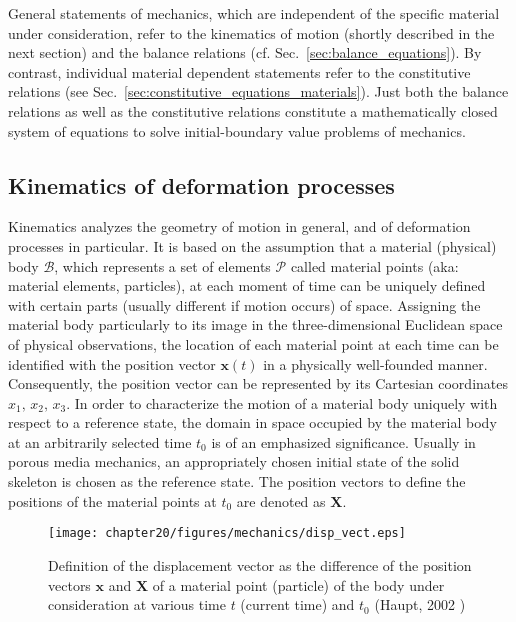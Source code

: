 General statements of mechanics, which are independent of the specific material under consideration, refer to the kinematics of motion (shortly described in the next section) and the balance relations (cf. Sec.~\ref{sec:balance_equations}). By contrast, individual material dependent statements refer to the constitutive relations (see Sec.~\ref{sec:constitutive_equations_materials}). Just both the balance relations as well as the constitutive relations constitute a mathematically closed system of equations to solve initial-boundary value problems of mechanics.

\subsection{Kinematics of deformation processes}
\label{sec:kinematics}

Kinematics analyzes the geometry of motion in general, and of deformation processes in particular. It is based on the assumption that a material (physical) body $\mathcal{B}$, which represents a set of elements $\mathcal{P}$ called material points (aka: material elements, particles), at each moment of time can be uniquely defined with certain parts (usually different if motion occurs) of space. Assigning the material body particularly to its image in the three-dimensional Euclidean space of physical observations, the location of each material point at each time can be identified with the position vector $\mathbf{x}(t)$ in a physically well-founded manner. Consequently, the position vector can be represented by its Cartesian coordinates $x_1,\,x_2,\,x_3$. In order to characterize the motion of a material body uniquely with respect to a reference state, the domain in space occupied by the material body at an arbitrarily selected time $t_0$ is of an emphasized significance. Usually in porous media mechanics, an appropriately chosen initial state of the solid skeleton is chosen as the reference state. The position vectors to define the positions of the material points at $t_0$ are denoted as $\mathbf{X}$.

\begin{figure}[htb!]
\begin{center}
\footnotesize
\texttt{[image: chapter20/figures/mechanics/disp\_vect.eps]}
\caption{Definition of the displacement vector as the difference of the position vectors $\mathbf{x}$ and $\mathbf{X}$ of a material point (particle) of the body under consideration at various time $t$ (current time) and $t_0$ (Haupt, 2002 \cite{Haupt:2002})}
\label{fig:disp_vect}
\end{center}
\end{figure}

